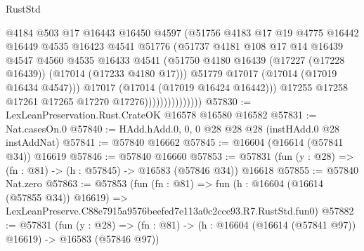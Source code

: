 \begin{lexlean}{RustStd}
\begin{coremodule}
                                  @4184
                                  @503
                                  @17
                                  @16443
                                  @16450
                                  @4597
                                  (@51756
                                    @4183
                                    @17
                                    @19
                                    @4775
                                    @16442
                                    @16449
                                    @4535
                                    @16423
                                    @4541
                                    @51776
                                    (@51737
                                      @4181
                                      @108
                                      @17
                                      @14
                                      @16439
                                      @4547
                                      @4560
                                      @4535
                                      @16433
                                      @4541
                                      (@51750
                                        @4180
                                        @16439
                                        (@17227 (@17228 @16439))
                                        (@17014 (@17233 @4180 @17)))
                                      @51779
                                      @17017
                                      (@17014 (@17019 @16434 @4547)))
                                    @17017
                                    (@17014 (@17019 @16424 @16442)))
                                  @17255
                                  @17258
                                  @17261
                                  @17265
                                  @17270
                                  @17276)))))))))))))))
@57830 := LexLeanPreservation.Rust.CrateOK @16578 @16580 @16582
@57831 := Nat.casesOn.{0}
@57840 := HAdd.hAdd.{0, 0, 0} @28 @28 @28 (instHAdd.{0} @28 instAddNat)
@57841 := @57840 @16662
@57845 := @16604 (@16614 (@57841 @34)) @16619
@57846 := @57840 @16660
@57853 := @57831 (fun (y : @28) => (fn : @81) -> (h : @57845) -> @16583 (@57846 @34)) @16618
@57855 := @57840 Nat.zero
@57863 := @57853
    (fun (fn : @81) =>
    fun (h : @16604 (@16614 (@57855 @34)) @16619) =>
    LexLeanPreserve.C88e7915a9576beefed7e113a0c2cce93.R7.RustStd.fun0)
@57882 := @57831
    (fun (y : @28) =>
    (fn : @81) -> (h : @16604 (@16614 (@57841 @97)) @16619) -> @16583 (@57846 @97))

\end{coremodule}
\end{lexlean}
